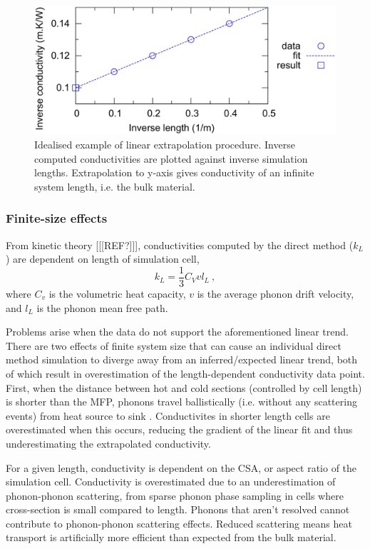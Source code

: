 \begin{figure}[h]
  \includegraphics[width=\linewidth]{Figures/ideal_extrap.png}
  \caption{Idealised example of linear extrapolation procedure. Inverse computed conductivities are plotted against inverse simulation lengths. Extrapolation to y-axis gives conductivity of an infinite system length, i.e. the bulk material.}
  \label{fig:ideal}
\end{figure}



\subsubsection{Finite-size effects}

From kinetic theory [[[REF?]]], conductivities computed by the direct method ($k_L$) are dependent on length of simulation cell,
%
\begin{equation}
k_{L} = \frac{1}{3} C_{V} v l_{L}\ ,
\label{length-dep}
\end{equation}
%
where $C_v$ is the volumetric heat capacity, $v$ is the average phonon drift velocity, and $l_L$ is the phonon mean free path. 

Problems arise when the data do not support the aforementioned linear trend. There are two effects of finite system size that can cause an individual direct method simulation to diverge away from an inferred/expected linear trend, both of which result in overestimation of the length-dependent conductivity data point. First, when the distance between hot and cold sections (controlled by cell length) is shorter than the MFP, phonons travel ballistically (i.e. without any scattering events) from heat source to sink \citep{Sellan2010}. Conductivites in shorter length cells are overestimated when this occurs, reducing the gradient of the linear fit and thus underestimating the extrapolated conductivity.

For a given length, conductivity is dependent on the CSA, or aspect ratio of the simulation cell. Conductivity is overestimated due to an underestimation of phonon-phonon scattering, from sparse phonon phase sampling in cells where cross-section is small compared to length. Phonons that aren't resolved cannot contribute to phonon-phonon scattering effects. Reduced scattering means heat transport is artificially more efficient than expected from the bulk material. 


